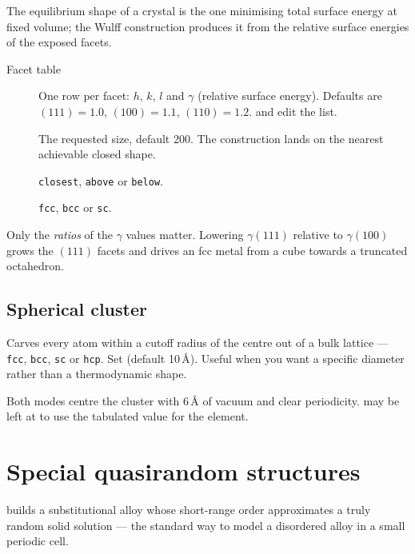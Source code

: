 The equilibrium shape of a crystal is the one minimising total surface
energy at fixed volume; the Wulff construction produces it from the
relative surface energies of the exposed facets.

\begin{description}
  \item[Facet table] One row per facet: $h$, $k$, $l$ and
    $\gamma$ (relative surface energy). Defaults are $(111)\!=\!1.0$,
    $(100)\!=\!1.1$, $(110)\!=\!1.2$.  and
     edit the list.
  \item[] The requested size, default 200. The
    construction lands on the nearest achievable closed shape.
  \item[] \texttt{closest}, \texttt{above} or
    \texttt{below}.
  \item[] \texttt{fcc}, \texttt{bcc} or \texttt{sc}.
\end{description}

Only the \emph{ratios} of the $\gamma$ values matter. Lowering
$\gamma(111)$ relative to $\gamma(100)$ grows the $(111)$ facets and drives
an fcc metal from a cube towards a truncated octahedron.

\subsection{Spherical cluster}

Carves every atom within a cutoff radius of the centre out of a bulk
lattice --- \texttt{fcc}, \texttt{bcc}, \texttt{sc} or \texttt{hcp}. Set
 (default 10\,\AA). Useful when you want a specific diameter
rather than a thermodynamic shape.

Both modes centre the cluster with 6\,\AA{} of vacuum and clear periodicity.
 may be left at  to use the tabulated
value for the element.

\section{Special quasirandom structures}
\label{sec:sqs}

\menusep{} builds a
substitutional alloy whose short-range order approximates a truly random
solid solution --- the standard way to model a disordered alloy in a small
periodic cell.

